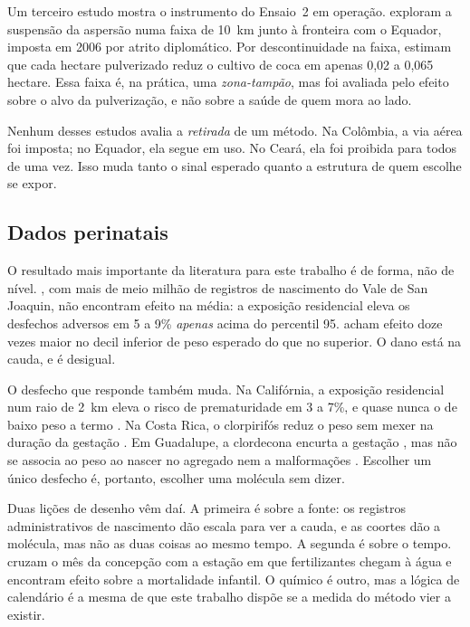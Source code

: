Um terceiro estudo mostra o instrumento do Ensaio~2 em operação.
\citet{mejia2014enforcement} exploram a suspensão da aspersão numa faixa de
10~km junto à fronteira com o Equador, imposta em 2006 por atrito diplomático.
Por descontinuidade na faixa, estimam que cada hectare pulverizado reduz o
cultivo de coca em apenas 0,02 a 0,065 hectare. Essa faixa é, na prática, uma
\emph{zona-tampão}, mas foi avaliada pelo efeito sobre o alvo da pulverização, e
não sobre a saúde de quem mora ao lado.

Nenhum desses estudos avalia a \emph{retirada} de um método. Na Colômbia, a via
aérea foi imposta; no Equador, ela segue em uso. No Ceará, ela foi proibida para
todos de uma vez. Isso muda tanto o sinal esperado quanto a estrutura de quem
escolhe se expor.

\subsection{Dados perinatais}

O resultado mais importante da literatura para este trabalho é de forma, não de
nível. \citet{larsen2017agricultural}, com mais de meio milhão de registros de
nascimento do Vale de San Joaquin, não encontram efeito na média: a exposição
residencial eleva os desfechos adversos em 5 a 9\% \emph{apenas} acima do
percentil 95. \citet{reynier2025glyphosate} acham efeito doze vezes maior no
decil inferior de peso esperado do que no superior. O dano está na cauda, e é
desigual.

O desfecho que responde também muda. Na Califórnia, a exposição residencial num
raio de 2~km eleva o risco de prematuridade em 3 a 7\%, e quase nunca o de baixo
peso a termo \citep{ling2018prenatal}. Na Costa Rica, o clorpirifós reduz o peso
sem mexer na duração da gestação \citep{vanwendel2024isa}. Em Guadalupe, a
clordecona encurta a gestação \citep{kadhel2014chlordecone}, mas não se associa
ao peso ao nascer no agregado \citep{herve2016chlordecone} nem a malformações
\citep{rouget2020chlordecone}. Escolher um único desfecho é, portanto, escolher
uma molécula sem dizer.

Duas lições de desenho vêm daí. A primeira é sobre a fonte: os registros
administrativos de nascimento dão escala para ver a cauda, e as coortes dão a
molécula, mas não as duas coisas ao mesmo tempo. A segunda é sobre o tempo.
\citet{brainerd2014seasonal} cruzam o mês da concepção com a estação em que
fertilizantes chegam à água e encontram efeito sobre a mortalidade infantil. O
químico é outro, mas a lógica de calendário é a mesma de que este trabalho
dispõe se a medida do método vier a existir.

